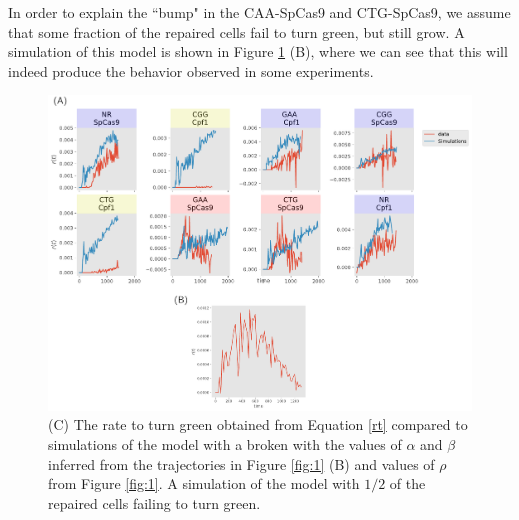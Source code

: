 \documentclass{article}
\begin{document}
In order to explain the ``bump" in the CAA-SpCas9 and CTG-SpCas9, we assume that some fraction of the repaired cells fail to turn green, but still grow. A simulation of this model is shown in Figure \ref{fig:2} (B), where we can see that this will indeed produce the behavior observed in some experiments. 




\begin{figure}[h!]
\centering
\includegraphics[scale=0.6]{fig2.pdf}
\caption{ (C) The rate to turn green obtained from Equation \ref{rt} compared to simulations of the model with a broken with the values of $\alpha$ and $\beta$ inferred from the trajectories in Figure \ref{fig:1} (B) and values of $\rho$ from Figure \ref{fig:1}. A simulation of the model with $1/2$ of the repaired cells failing to turn green.  }\label{fig:2}
\end{figure}
\end{document}
